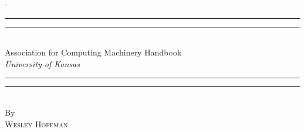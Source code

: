 %
%
% 
%
%
\begin{titlingpage}
\begin{SingleSpace}
\calccentering{\unitlength} 
\begin{adjustwidth*}{\unitlength}{-\unitlength}
\vspace*{13mm}
\begin{center}
\rule[0.5ex]{\linewidth}{2pt}\vspace*{-\baselineskip}\vspace*{3.2pt}
\rule[0.5ex]{\linewidth}{1pt}\\[\baselineskip]
{\HUGE Association for Computing Machinery Handbook }\\[4mm]
{\Large \textit{University of Kansas}}\\
\rule[0.5ex]{\linewidth}{1pt}\vspace*{-\baselineskip}\vspace{3.2pt}
\rule[0.5ex]{\linewidth}{2pt}\\
\vspace{6.5mm}
{\large By}\\
\vspace{6.5mm}
{\large\textsc{Wesley Hoffman}}\\
\vspace{11mm}

\end{center}
\end{adjustwidth*}
\end{SingleSpace}
\end{titlingpage}
